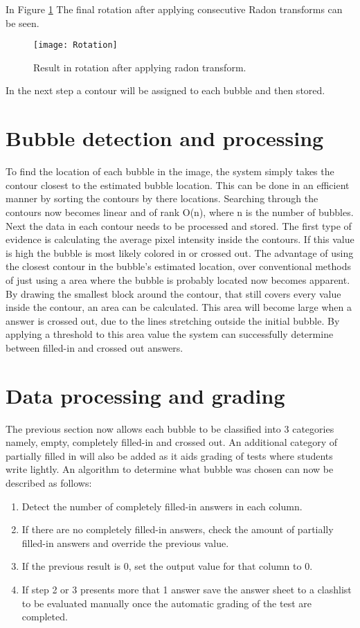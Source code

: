 In Figure \ref{fig:reduced} The final rotation after applying consecutive Radon transforms can be seen.

\begin{figure}
  \centering
  \texttt{[image: Rotation]}\\
  \caption{Result in rotation after applying radon transform.}
  \label{fig:reduced}
\end{figure}

In the next step a contour will be assigned to each bubble and then stored.

\section{Bubble detection and processing}

To find the location of each bubble in the image, the system simply takes the contour closest to the estimated bubble location. This can be done in an efficient manner by sorting the contours by there locations. Searching through the contours now becomes linear and of rank O(n), where n is the number of bubbles. Next the data in each contour needs to be processed and stored. The first type of evidence is calculating the average pixel intensity inside the contours. If this value is high the bubble is most likely colored in or crossed out. The advantage of using the closest contour in the bubble's estimated location, over conventional methods of just using  a area where the bubble is probably located now becomes apparent. By drawing the smallest block around the contour, that still covers every value inside the contour, an area can be calculated. This area will become large when a answer is crossed out, due to the lines stretching outside the initial bubble. By applying a threshold to this area value the system can successfully determine between filled-in and crossed out answers.

\section{Data processing and grading}

The previous section now allows each bubble to be classified into 3 categories namely, empty, completely filled-in and crossed out. An additional category of partially filled in will also be added as it aids grading of tests where students write lightly. An algorithm to determine what bubble was chosen can now be described as follows:

\begin{enumerate}
\item Detect the number of completely filled-in answers in each column.
\item If there are no completely filled-in answers, check the amount of partially filled-in answers and override the previous value.
\item If the previous result is 0, set the output value for that column to 0.
\item If step 2 or 3 presents more that 1 answer save the answer sheet to a clashlist to be evaluated manually once the automatic grading of the test are completed.
\end{enumerate}


